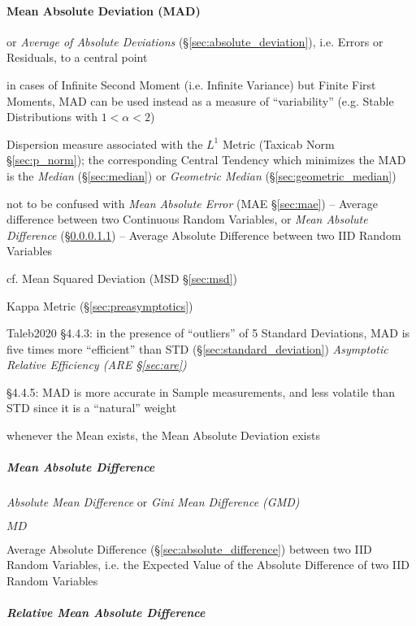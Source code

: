 \paragraph{Mean Absolute Deviation (MAD)}\label{sec:mad}\hfill

or \emph{Average of Absolute Deviations} (\S\ref{sec:absolute_deviation}), i.e.
Errors or Residuals, to a central point

in cases of Infinite Second Moment (i.e. Infinite Variance) but Finite First
Moments, MAD can be used instead as a measure of ``variability'' (e.g. Stable
Distributions with $1 < \alpha < 2$)

Dispersion measure associated with the $L^1$ Metric (Taxicab Norm
\S\ref{sec:p_norm}); the corresponding Central Tendency which minimizes the MAD
is the \emph{Median} (\S\ref{sec:median}) or \emph{Geometric Median}
(\S\ref{sec:geometric_median})

\fist not to be confused with \emph{Mean Absolute Error} (MAE \S\ref{sec:mae})
-- Average difference between two Continuous Random Variables,
or \emph{Mean Absolute Difference} (\S\ref{sec:mean_absolute_difference}) --
Average Absolute Difference between two IID Random Variables

cf. Mean Squared Deviation (MSD \S\ref{sec:msd})

Kappa Metric (\S\ref{sec:preasymptotics})

Taleb2020 \S 4.4.3: in the presence of ``outliers'' of 5 Standard Deviations,
MAD is five times more ``efficient'' than STD (\S\ref{sec:standard_deviation})
\fist \emph{Asymptotic Relative Efficiency (ARE \S\ref{sec:are})}

\S 4.4.5: MAD is more accurate in Sample measurements, and less volatile than
STD since it is a ``natural'' weight

whenever the Mean exists, the Mean Absolute Deviation exists



\subparagraph{Mean Absolute Difference}
\label{sec:mean_absolute_difference}\hfill

\emph{Absolute Mean Difference} or \emph{Gini Mean Difference (GMD)}

$MD$

Average Absolute Difference (\S\ref{sec:absolute_difference}) between two IID
Random Variables, i.e. the Expected Value of the Absolute Difference of two IID
Random Variables



\subparagraph{Relative Mean Absolute Difference}
\label{sec:relative_mean_absolute_difference}\hfill

